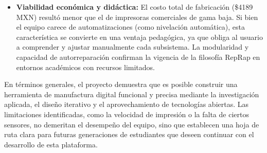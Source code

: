 \begin{itemize}
    \item \textbf{Viabilidad económica y didáctica:} El costo total de 
    fabricación (\$4189 MXN) resultó menor que el de impresoras comerciales 
    de gama baja. Si bien el equipo carece de automatizaciones (como 
    nivelación automática), esta característica se convierte en una ventaja 
    pedagógica, ya que obliga al usuario a comprender y ajustar manualmente 
    cada subsistema. La modularidad y capacidad de autorreparación confirman 
    la vigencia de la filosofía RepRap en entornos académicos con recursos 
    limitados.
\end{itemize}

En términos generales, el proyecto demuestra que es posible construir una 
herramienta de manufactura digital funcional y precisa mediante la 
investigación aplicada, el diseño iterativo y el aprovechamiento de 
tecnologías abiertas. Las limitaciones identificadas, como la velocidad de 
impresión o la falta de ciertos sensores, no demeritan el desempeño del 
equipo, sino que establecen una hoja de ruta clara para futuras generaciones 
de estudiantes que deseen continuar con el desarrollo de esta plataforma.